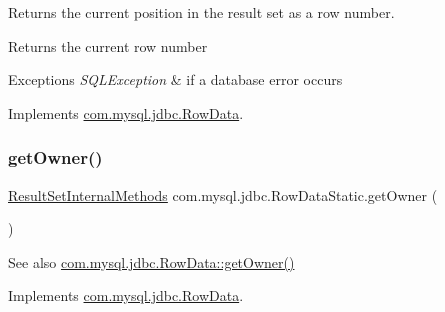 Returns the current position in the result set as a row number.

\begin{DoxyReturn}{Returns}
the current row number 
\end{DoxyReturn}

\begin{DoxyExceptions}{Exceptions}
{\em S\+Q\+L\+Exception} & if a database error occurs \\
\hline
\end{DoxyExceptions}


Implements \mbox{\hyperlink{interfacecom_1_1mysql_1_1jdbc_1_1_row_data_aec8ec45fafa52ded12507aa708efbdf7}{com.\+mysql.\+jdbc.\+Row\+Data}}.

\mbox{\label{classcom_1_1mysql_1_1jdbc_1_1_row_data_static_af72520ce25978b10995a00de1bd2ecc4}} 
\subsubsection{\texorpdfstring{get\+Owner()}{getOwner()}}
{\footnotesize\ttfamily \mbox{\hyperlink{interfacecom_1_1mysql_1_1jdbc_1_1_result_set_internal_methods}{Result\+Set\+Internal\+Methods}} com.\+mysql.\+jdbc.\+Row\+Data\+Static.\+get\+Owner (\begin{DoxyParamCaption}{ }\end{DoxyParamCaption})}

\begin{DoxySeeAlso}{See also}
\mbox{\hyperlink{interfacecom_1_1mysql_1_1jdbc_1_1_row_data_adb65eef9f8713ed4c3a1eb67eafaaf86}{com.\+mysql.\+jdbc.\+Row\+Data\+::get\+Owner()}} 
\end{DoxySeeAlso}


Implements \mbox{\hyperlink{interfacecom_1_1mysql_1_1jdbc_1_1_row_data_adb65eef9f8713ed4c3a1eb67eafaaf86}{com.\+mysql.\+jdbc.\+Row\+Data}}.

\mbox{\label{classcom_1_1mysql_1_1jdbc_1_1_row_data_static_aaa4aefb2beeb7f12906587084204cee1}} 
